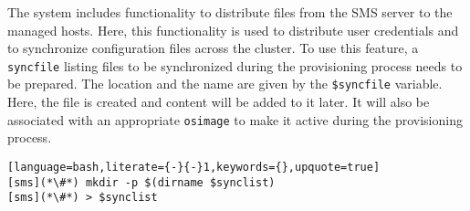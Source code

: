 The \xCAT{} system includes functionality to distribute files from the SMS
server to the managed hosts. Here, this functionality is used to distribute user
credentials and to synchronize configuration files across the cluster.  To use
this feature, a \texttt{syncfile} listing files to be synchronized during the
provisioning process needs to be prepared. The location and the name are given
by the \texttt{\$syncfile} variable. Here, the file is created and content will
be added to it later. It will also be associated with an appropriate
\texttt{osimage} to make it active during the \xCAT{} provisioning process.

\begin{lstlisting}[language=bash,literate={-}{-}1,keywords={},upquote=true]
[sms](*\#*) mkdir -p $(dirname $synclist)
[sms](*\#*) > $synclist
\end{lstlisting}
